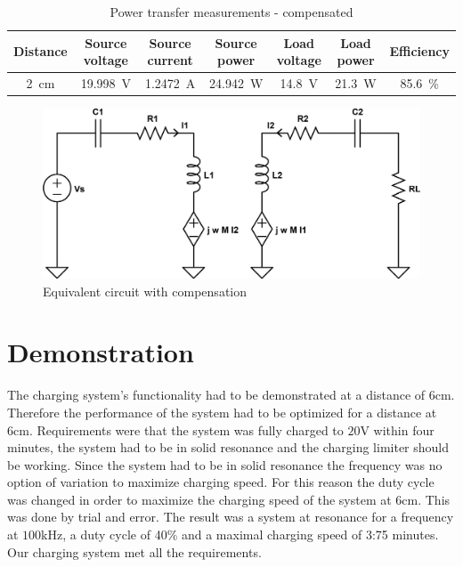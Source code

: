 \documentclass[11pt,titlepage]{report}
\begin{document}
\begin{table}[H]
	\centering
	\begin{tabular}{c c c c c c c}
		\hline\hline
		Distance & Source voltage & Source current & Source power & Load voltage & Load power & Efficiency \\
		\hline
		\SI{2}{cm} & \SI{19.998}{V} & \SI{1.2472}{A} & \SI{24.942}{W} & \SI{14.8}{V} & \SI{21.3}{W} & \SI{85.6}{\percent} \\
		\hline
		\end{tabular}
			\caption{Power transfer measurements - compensated}
			\label{tab:ass2_power}
\end{table}

\begin{figure}[H]
	\begin{center}
		\includegraphics[width=0.8\linewidth]{resource/cpt-equivalent-circuit-rc.pdf}
	\end{center}
	\caption{Equivalent circuit with compensation}
	\label{fig:ass2_eq_circ}
\end{figure}

\section{Demonstration}
The charging system's functionality had to be demonstrated at a distance of 6cm. Therefore the performance of the system had to be optimized for a distance at 6cm. Requirements were that the system was fully charged to $20$V within four minutes, the system had to be in solid resonance and the charging limiter should be working. Since the system had to be in solid resonance the frequency was no option of variation to maximize charging speed. For this reason the duty cycle was changed in order to maximize the charging speed of the system at 6cm. This was done by trial and error. The result was a system at resonance for a frequency at $100$kHz, a duty cycle of 40\% and a maximal charging speed of 3:75 minutes. Our charging system met all the requirements. 
\end{document}

